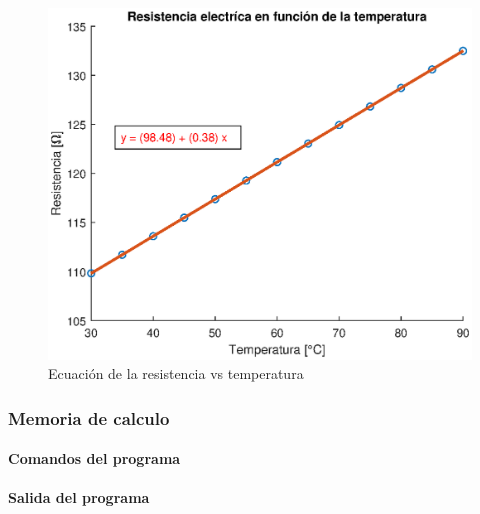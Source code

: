 \documentclass[letter,11pt]{article}
\begin{document}
\begin{figure}[!h]
\centering
\includegraphics[scale=1.00]{eps/3.3.2.eps}
\caption{Ecuación de la resistencia vs temperatura}
\label{practica43_2}
\end{figure}

\subsubsection{Memoria de calculo}

\paragraph{Comandos del programa}
\begin{alltt}
\footnotesize

\normalsize
\end{alltt}

\paragraph{Salida del programa}
\begin{alltt}
\footnotesize

\normalsize
\end{alltt}
\end{document}
